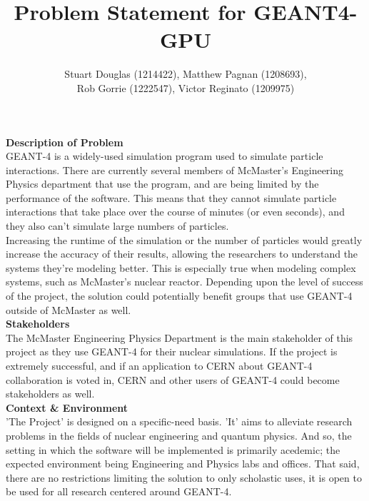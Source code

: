 \documentclass[12pt]{article}
\begin{document}
\title{\vspace{-4em}Problem Statement for GEANT4-GPU} \author{Stuart Douglas
(1214422), Matthew Pagnan (1208693), \\ Rob Gorrie (1222547), Victor Reginato
(1209975)}
	
\maketitle


\noindent \textbf{Description of Problem}\\ GEANT-4 is a widely-used simulation
program used to simulate particle interactions. There are currently several
members of McMaster's Engineering Physics department that use the program, and
are being limited by the performance of the software. This means that they
cannot simulate particle interactions that take place over the course of minutes
(or even seconds), and they also can't simulate large numbers of particles.\\

\noindent Increasing the runtime of the simulation or the number of particles
would greatly increase the accuracy of their results, allowing the researchers
to understand the systems they're modeling better. This is especially true when
modeling complex systems, such as McMaster's nuclear reactor. Depending upon the
level of success of the project, the solution could potentially benefit groups
that use GEANT-4 outside of McMaster as well.\\

\noindent \textbf{Stakeholders}\\ The McMaster Engineering Physics Department is
the main stakeholder of this project as they use GEANT-4 for their nuclear
simulations. If the project is extremely successful, and if an
application to CERN about GEANT-4 collaboration is voted in, CERN and other
users of GEANT-4 could become stakeholders as well.\\

\noindent \textbf{Context \& Environment}\\ 'The Project' is designed on a specific-need basis.
'It' aims to alleviate research problems in the fields of nuclear engineering and quantum physics.
And so, the setting in which the software will be implemented is primarily acedemic; the expected
environment being Engineering and Physics labs and offices. That said, there are no restrictions
limiting the solution to only scholastic uses, it is open to be used for all research centered around 
GEANT-4.
 \\ 
\end{document}
